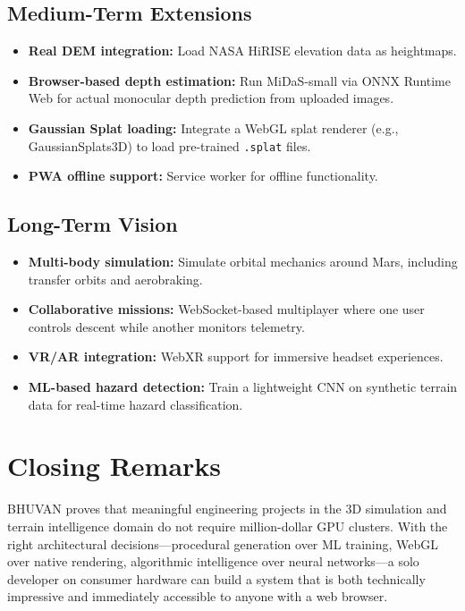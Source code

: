 \subsection{Medium-Term Extensions}
\begin{itemize}
    \item \textbf{Real DEM integration:} Load NASA HiRISE elevation data as heightmaps.
    \item \textbf{Browser-based depth estimation:} Run MiDaS-small via ONNX Runtime Web for actual monocular depth prediction from uploaded images.
    \item \textbf{Gaussian Splat loading:} Integrate a WebGL splat renderer (e.g., GaussianSplats3D) to load pre-trained \texttt{.splat} files.
    \item \textbf{PWA offline support:} Service worker for offline functionality.
\end{itemize}

\subsection{Long-Term Vision}
\begin{itemize}
    \item \textbf{Multi-body simulation:} Simulate orbital mechanics around Mars, including transfer orbits and aerobraking.
    \item \textbf{Collaborative missions:} WebSocket-based multiplayer where one user controls descent while another monitors telemetry.
    \item \textbf{VR/AR integration:} WebXR support for immersive headset experiences.
    \item \textbf{ML-based hazard detection:} Train a lightweight CNN on synthetic terrain data for real-time hazard classification.
\end{itemize}

\section{Closing Remarks}
BHUVAN proves that meaningful engineering projects in the 3D simulation and terrain intelligence domain do not require million-dollar GPU clusters. With the right architectural decisions---procedural generation over ML training, WebGL over native rendering, algorithmic intelligence over neural networks---a solo developer on consumer hardware can build a system that is both technically impressive and immediately accessible to anyone with a web browser.
